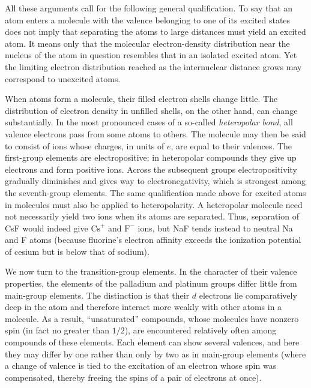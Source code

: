 All these arguments call for the following general qualification. To say that an atom enters a molecule with the valence belonging to one of its excited states does not imply that separating the atoms to large distances must yield an excited atom. It means only that the molecular electron-density distribution near the nucleus of the atom in question resembles that in an isolated excited atom. Yet the limiting electron distribution reached as the internuclear distance grows may correspond to unexcited atoms.

When atoms form a molecule, their filled electron shells change little. The distribution of electron density in unfilled shells, on the other hand, can change substantially. In the most pronounced cases of a so-called \emph{heteropolar bond}, all valence electrons pass from some atoms to others. The molecule may then be said to consist of ions whose charges, in units of $e$, are equal to their valences. The first-group elements are electropositive: in heteropolar compounds they give up electrons and form positive ions. Across the subsequent groups electropositivity gradually diminishes and gives way to electronegativity, which is strongest among the seventh-group elements. The same qualification made above for excited atoms in molecules must also be applied to heteropolarity. A heteropolar molecule need not necessarily yield two ions when its atoms are separated. Thus, separation of CsF would indeed give $\mathrm{Cs}^+$ and $\mathrm F^-$ ions, but NaF tends instead to neutral Na and F atoms (because fluorine's electron affinity exceeds the ionization potential of cesium but is below that of sodium).



We now turn to the transition-group elements. In the character of their valence properties, the elements of the palladium and platinum groups differ little from main-group elements. The distinction is that their $d$ electrons lie comparatively deep in the atom and therefore interact more weakly with other atoms in a molecule. As a result, ``unsaturated'' compounds, whose molecules have nonzero spin (in fact no greater than $1/2$), are encountered relatively often among compounds of these elements. Each element can show several valences, and here they may differ by one rather than only by two as in main-group elements (where a change of valence is tied to the excitation of an electron whose spin was compensated, thereby freeing the spins of a pair of electrons at once).

